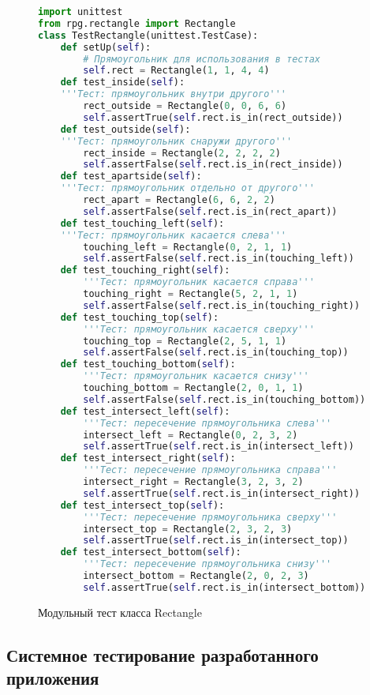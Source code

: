 \begin{figure}[H]
\begin{lstlisting}[language=Python]
import unittest
from rpg.rectangle import Rectangle
class TestRectangle(unittest.TestCase):
	def setUp(self):
		# Прямоугольник для использования в тестах
		self.rect = Rectangle(1, 1, 4, 4)
	def test_inside(self):
	'''Тест: прямоугольник внутри другого'''
		rect_outside = Rectangle(0, 0, 6, 6)
		self.assertTrue(self.rect.is_in(rect_outside))
	def test_outside(self):
	'''Тест: прямоугольник снаружи другого'''
		rect_inside = Rectangle(2, 2, 2, 2)
		self.assertFalse(self.rect.is_in(rect_inside))
	def test_apartside(self):
	'''Тест: прямоугольник отдельно от другого'''
		rect_apart = Rectangle(6, 6, 2, 2)
		self.assertFalse(self.rect.is_in(rect_apart))
	def test_touching_left(self):
	'''Тест: прямоугольник касается слева'''
		touching_left = Rectangle(0, 2, 1, 1)
		self.assertFalse(self.rect.is_in(touching_left))
	def test_touching_right(self):
		'''Тест: прямоугольник касается справа'''
		touching_right = Rectangle(5, 2, 1, 1)
		self.assertFalse(self.rect.is_in(touching_right))
	def test_touching_top(self):
		'''Тест: прямоугольник касается сверху'''
		touching_top = Rectangle(2, 5, 1, 1)
		self.assertFalse(self.rect.is_in(touching_top))
	def test_touching_bottom(self):
		'''Тест: прямоугольник касается снизу'''
		touching_bottom = Rectangle(2, 0, 1, 1)
		self.assertFalse(self.rect.is_in(touching_bottom))
	def test_intersect_left(self):
		'''Тест: пересечение прямоугольника слева'''
		intersect_left = Rectangle(0, 2, 3, 2)
		self.assertTrue(self.rect.is_in(intersect_left))
	def test_intersect_right(self):
		'''Тест: пересечение прямоугольника справа'''
		intersect_right = Rectangle(3, 2, 3, 2)
		self.assertTrue(self.rect.is_in(intersect_right))
	def test_intersect_top(self):
		'''Тест: пересечение прямоугольника сверху'''
		intersect_top = Rectangle(2, 3, 2, 3)
		self.assertTrue(self.rect.is_in(intersect_top))
	def test_intersect_bottom(self):
		'''Тест: пересечение прямоугольника снизу'''
		intersect_bottom = Rectangle(2, 0, 2, 3)
		self.assertTrue(self.rect.is_in(intersect_bottom))
\end{lstlisting}  
\caption{Модульный тест класса Rectangle}
\label{unitRec:image}
\end{figure}

\subsection{Системное тестирование разработанного приложения}

